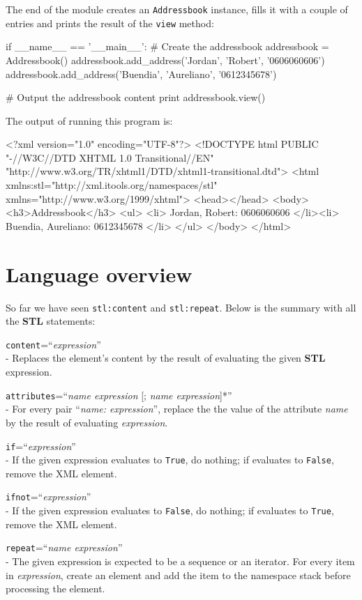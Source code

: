 The end of the module creates an {\tt Addressbook} instance, fills it with
a couple of entries and prints the result of the {\tt view} method:

\begin{code}
    if __name__ == '__main__':
        # Create the addressbook
        addressbook = Addressbook()
        addressbook.add_address('Jordan', 'Robert', '0606060606')
        addressbook.add_address('Buendia', 'Aureliano', '0612345678')

        # Output the addressbook content
        print addressbook.view()
\end{code}

The output of running this program is:

\begin{code}
    <?xml version="1.0" encoding="UTF-8"?>
    <!DOCTYPE html
         PUBLIC "-//W3C//DTD XHTML 1.0 Transitional//EN"
        "http://www.w3.org/TR/xhtml1/DTD/xhtml1-transitional.dtd">
    <html xmlns:stl="http://xml.itools.org/namespaces/stl"
          xmlns="http://www.w3.org/1999/xhtml">
      <head></head>
      <body>
        <h3>Addressbook</h3>
        <ul>
          <li>
            Jordan,
            Robert:
            0606060606
          </li><li>
            Buendia,
            Aureliano:
            0612345678
          </li>
        </ul>
      </body>
    </html>
\end{code}


\section{Language overview}

So far we have seen {\tt stl:content} and {\tt stl:repeat}. Below is the
summary with all the {\bf STL} statements:

\begin{api}
    {\tt content}=``{\em expression}''\\
    - Replaces the element's content by the result of evaluating the given
    {\bf STL} expression.

    {\tt attributes}=``{\em name expression} [; {\em name expression}]*''\\
    - For every pair ``{\em name: expression}'', replace the the value of
    the attribute {\em name} by the result of evaluating {\em expression}.

    {\tt if}=``{\em expression}''\\
    - If the given expression evaluates to {\tt True}, do nothing; if
    evaluates to {\tt False}, remove the XML element.

    {\tt ifnot}=``{\em expression}''\\
    - If the given expression evaluates to {\tt False}, do nothing; if
    evaluates to {\tt True}, remove the XML element.

    {\tt repeat}=``{\em name expression}''\\
    - The given expression is expected to be a sequence or an iterator.
    For every item in {\em expression}, create an element and add the
    item to the namespace stack before processing the element.
\end{api}



